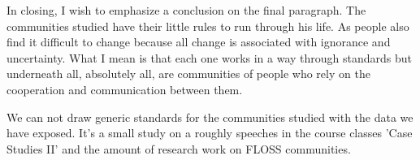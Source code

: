 \documentclass[11pt]{scrartcl}
\begin{document}
\par In closing, I wish to emphasize a conclusion on the final paragraph. The communities studied have their little rules to run through his life. As people also find it difficult to change because all change is associated with ignorance and uncertainty. What I mean is that each one works in a way through standards but underneath all, absolutely all, are communities of people who rely on the cooperation and communication between them.

\par We can not draw generic standards for the communities studied with the data we have exposed. It's a small study on a roughly speeches in the course classes 'Case Studies II' and the amount of research work on FLOSS communities.

\end{document}
